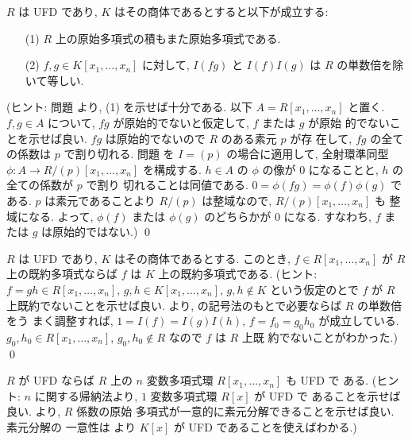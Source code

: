 \documentclass[12pt,twoside]{jarticle}
\begin{document}
\begin{question}\label{q:Gauss-lemma}
  $R$ は UFD であり, $K$ はその商体であるとすると以下が成立する:
  \begin{itemize}
  \item[(1)] $R$ 上の原始多項式の積もまた原始多項式である.
  \item[(2)] $f,g\in K[x_1,\ldots,x_n]$ に対して, 
    $I(fg)$ と $I(f)I(g)$ は $R$ の単数倍を除いて等しい. 
  \end{itemize}
  (ヒント: 問題  より, (1) を示せば十分である.
  以下 $A=R[x_1,\ldots,x_n]$ と置く.
  $f,g\in A$ について, $fg$ が原始的でないと仮定して, $f$ または $g$ が原始
  的でないことを示せば良い.  $fg$ は原始的でないので $R$ のある素元 $p$ が存
  在して, $fg$ の全ての係数は $p$ で割り切れる.
  問題  を $I=(p)$ の場合に適用して,
  全射環準同型 $\phi:A\to R/(p)[x_1,\ldots,x_n]$ を構成する.
  $h\in A$ の $\phi$ の像が $0$ になることと, $h$ の全ての係数が $p$ で割り
  切れることは同値である.
  $0 = \phi(fg) = \phi(f)\phi(g)$ である. 
  $p$ は素元であることより $R/(p)$ は整域なので, $R/(p)[x_1,\ldots,x_n]$ も
  整域になる.
  よって, $\phi(f)$ または $\phi(g)$ のどちらかが $0$ になる. 
  すなわち, $f$ または $g$ は原始的ではない.)  
  \qed
\end{question}

\begin{question}
  $R$ は UFD であり, $K$ はその商体であるとする. 
  このとき, $f\in R[x_1,\ldots,x_n]$ が $R$ 上の既約多項式ならば %
  $f$ は $K$ 上の既約多項式である. 
  (ヒント: $f=gh\in R[x_1,\ldots,x_n]$, $g,h\in K[x_1,\ldots,x_n]$, 
  $g,h\not\in K$ という仮定のとで $f$ が $R$ 上既約でないことを示せば良い.
   より, 
   の記号法のもとで必要ならば $R$ の単数倍をう
  まく調整すれば, $1=I(f)=I(g)I(h)$, $f=f_0=g_0 h_0$ が成立している. 
  $g_0,h_0\in R[x_1,\ldots,x_n]$, $g_0,h_0\not\in R$ なので $f$ は $R$ 上既
  約でないことがわかった.) \qed
\end{question}

\begin{question}
  $R$ が UFD ならば $R$ 上の $n$ 変数多項式環 $R[x_1,\ldots,x_n]$ も UFD で
  ある.  (ヒント: $n$ に関する帰納法より, $1$ 変数多項式環 $R[x]$ が UFD で
  あることを示せば良い.  より, $R$ 係数の原始
  多項式が一意的に素元分解できることを示せば良い. 素元分解の
  一意性は  より $K[x]$ が UFD であることを使えばわかる.) 
\end{question}
\end{document}
